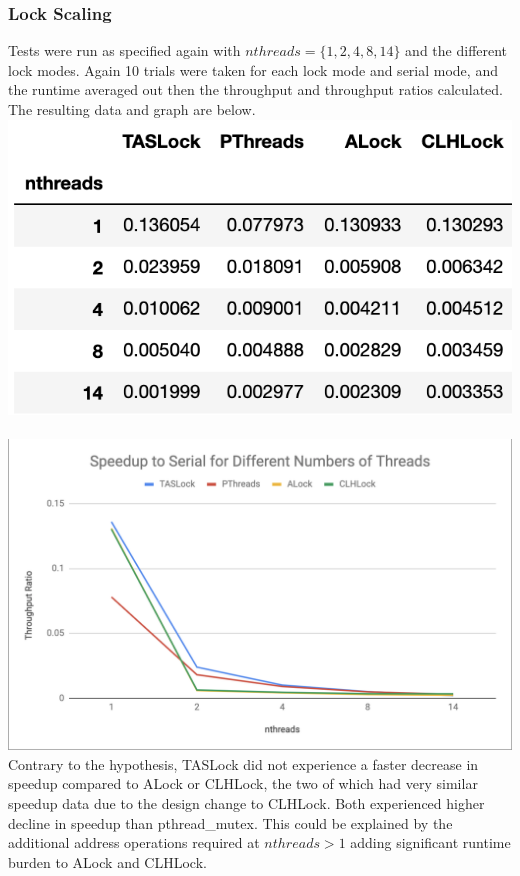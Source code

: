 \documentclass{article}
\begin{document}
\begin{adjustwidth}{-2cm}{-2cm}
\subsubsection{Lock Scaling}
Tests were run as specified again with $nthreads = \{1, 2, 4, 8, 14\}$ and the different lock modes. Again 10 trials were taken for each lock mode and serial mode, and the runtime averaged out then the throughput and throughput ratios calculated. The resulting data and graph are below.\\
\includegraphics[width=\linewidth]{scalingdata.png}\\
\null\\
\includegraphics[width=\linewidth]{scalinggraph.png}\\
Contrary to the hypothesis, TASLock did not experience a faster decrease in speedup compared to ALock or CLHLock, the two of which had very similar speedup data due to the design change to CLHLock. Both experienced higher decline in speedup than pthread\_mutex. This could be explained by the additional address operations required at $nthreads > 1$ adding significant runtime burden to ALock and CLHLock.\\

\end{adjustwidth}
\end{document}
